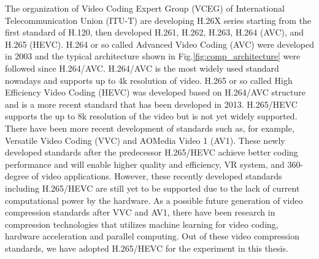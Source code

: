 The organization of Video Coding Expert Group (VCEG) of International Telecommunication Union (ITU-T) are developing H.26X series starting from the first standard of H.120, then developed H.261, H.262, H.263, H.264 (AVC), and H.265 (HEVC). H.264 or so called Advanced Video Coding (AVC) were developed in 2003 and the typical architecture shown in Fig.\ref{fig:comp_architecture} were followed since H.264/AVC. H.264/AVC is the most widely used standard nowadays and supports up to 4k resolution of video. H.265 or so called High Efficiency Video Coding (HEVC) was developed based on H.264/AVC structure and is a more recent standard that has been developed in 2013. H.265/HEVC supports the up to 8k resolution of the video but is not yet widely supported. There have been more recent development of standards such as, for example, Versatile Video Coding (VVC) and AOMedia Video 1 (AV1). These newly developed standards after the predecessor H.265/HEVC achieve better coding performance and will enable higher quality and efficiency, VR system, and 360-degree of video applications. However, these recently developed standards including H.265/HEVC are still yet to be supported due to the lack of current computational power by the hardware. As a possible future generation of video compression standards after VVC and AV1, there have been research in compression technologies that utilizes machine learning for video coding, hardware acceleration and parallel computing. Out of these video compression standards, we have adopted H.265/HEVC for the experiment in this thesis.